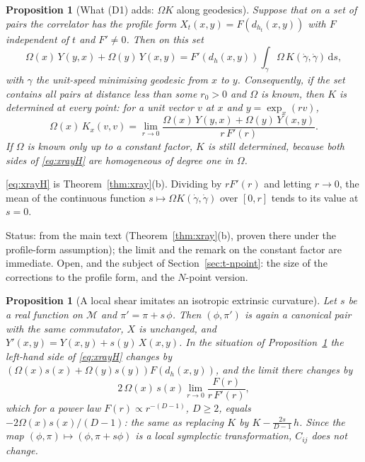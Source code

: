 \documentclass[11pt,a4paper]{article}
\makeatletter
\theoremstyle{stmt}
\newtheorem{proposition}[theorem]{Proposition}
\theoremstyle{defn}
\theoremstyle{rmk}
\renewenvironment{proof}[1][\proofname]{\par\pushQED{\qed}\normalfont\topsep6\p@\@plus6\p@\relax
  \trivlist\item[\hskip\labelsep{\sffamily\itshape\small #1.}]\ignorespaces}{\popQED\endtrivlist\@endpefalse}
\numberwithin{equation}{section}
\newcommand{\status}[1]{\par\noindent\textsf{\small Status: #1}\par}
\newcommand{\M}{\mathcal{M}}
\newcommand{\dd}{\mathrm{d}}
\makeatother
\begin{document}
{\begin{proposition}[What \textup{(D1)} adds: $\Omega K$ along geodesics]\label{prop:D1}
Suppose that on a set of pairs the correlator has the profile form $X_t(x,y)=F(d_{h_t}(x,y))$ with $F$ independent of $t$ and $F'\ne0$. Then on this set
\begin{equation}\label{eq:xrayH}
\Omega(x)\,Y(y,x)+\Omega(y)\,Y(x,y)=F'(d_h(x,y))\int_\gamma\Omega\,K(\dot\gamma,\dot\gamma)\,\dd s ,
\end{equation}
with $\gamma$ the unit-speed minimising geodesic from $x$ to $y$. Consequently, if the set contains all pairs at distance less than some $r_0>0$ and $\Omega$ is known, then $K$ is determined at every point: for a unit vector $v$ at $x$ and $y=\exp_x(rv)$,
\[
\Omega(x)\,K_x(v,v)=\lim_{r\to0}\frac{\Omega(x)\,Y(y,x)+\Omega(y)\,Y(x,y)}{r\,F'(r)} .
\]
If $\Omega$ is known only up to a constant factor, $K$ is still determined, because both sides of \eqref{eq:xrayH} are homogeneous of degree one in $\Omega$.
\end{proposition}

\begin{proof}
\eqref{eq:xrayH} is Theorem~\ref{thm:xray}(b). Dividing by $rF'(r)$ and letting $r\to0$, the mean of the continuous function $s\mapsto\Omega K(\dot\gamma,\dot\gamma)$ over $[0,r]$ tends to its value at $s=0$.
\end{proof}
\status{from the main text (Theorem~\ref{thm:xray}(b), proven there under the profile-form assumption); the limit and the remark on the constant factor are immediate. Open, and the subject of Section~\ref{sec:t-npoint}: the size of the corrections to the profile form, and the $N$-point version.}

\begin{proposition}[A local shear imitates an isotropic extrinsic curvature]\label{prop:shear}
Let $s$ be a real function on $\M$ and $\pi'=\pi+s\,\phi$. Then $(\phi,\pi')$ is again a canonical pair with the same commutator, $X$ is unchanged, and $Y'(x,y)=Y(x,y)+s(y)\,X(x,y)$. In the situation of Proposition~\ref{prop:D1} the left-hand side of \eqref{eq:xrayH} changes by $(\Omega(x)s(x)+\Omega(y)s(y))F(d_h(x,y))$, and the limit there changes by
\[
2\,\Omega(x)\,s(x)\lim_{r\to0}\frac{F(r)}{r\,F'(r)} ,
\]
which for a power law $F(r)\propto r^{-(D-1)}$, $D\ge2$, equals $-2\Omega(x)s(x)/(D-1)$: the same as replacing $K$ by $K-\frac{2s}{D-1}\,h$. Since the map $(\phi,\pi)\mapsto(\phi,\pi+s\phi)$ is a local symplectic transformation, $C_{ij}$ does not change.
\end{proposition}

}
\end{document}
